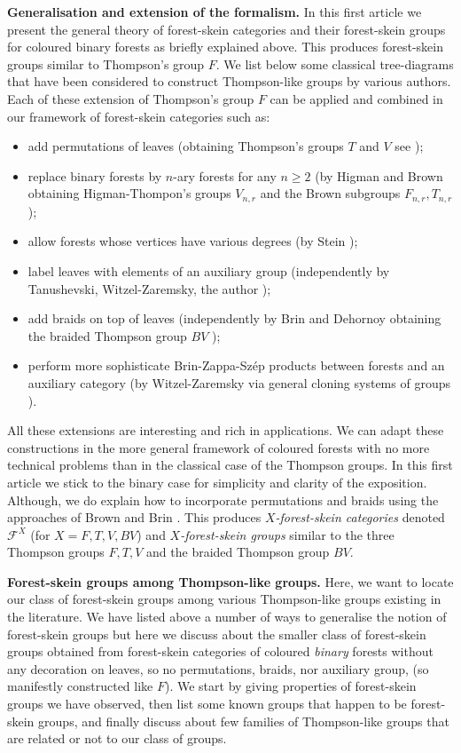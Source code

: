 \documentclass[a4paper, 12pt]{amsart}
\numberwithin{equation}{section}
\theoremstyle{definition}
\newcommand{\cF}{\mathcal F}
\begin{document}
{\bf Generalisation and extension of the formalism.}
In this first article we present the general theory of forest-skein categories and their forest-skein groups for coloured binary forests as briefly explained above. 
This produces forest-skein groups similar to Thompson's group $F$.
We list below some classical tree-diagrams that have been considered to construct Thompson-like groups by various authors. 
Each of these extension of Thompson's group $F$ can be applied and combined in our framework of forest-skein categories such as: 
\begin{itemize}
\item add permutations of leaves (obtaining Thompson's groups $T$ and $V$ see \cite{Brown87});
\item replace binary forests by $n$-ary forests for any $n\geq 2$ (by Higman and Brown obtaining Higman-Thompon's groups $V_{n,r}$ and the Brown subgroups $F_{n,r}, T_{n,r}$ \cite{Higman74,Brown87});
\item allow forests whose vertices have various degrees (by Stein \cite{Stein92});
\item label leaves with elements of an auxiliary group (independently by Tanushevski, Witzel-Zaremsky, the author \cite{Tanushevski16,Witzel-Zaremsky18, Brothier22, Brothier21});
\item add braids on top of leaves (independently by Brin and Dehornoy obtaining the braided Thompson group $BV$ \cite{Brin-BV1,Brin-BV2,Dehornoy06});
\item perform more sophisticate Brin-Zappa-Sz\'ep products between forests and an auxiliary category (by Witzel-Zaremsky via general cloning systems of groups \cite{Witzel-Zaremsky18}).
\end{itemize}
All these extensions are interesting and rich in applications. 
We can adapt these constructions in the more general framework of coloured forests with no more technical problems than in the classical case of the Thompson groups. 
In this first article we stick to the binary case for simplicity and clarity of the exposition. 
Although, we do explain how to incorporate permutations and braids using the approaches of Brown and Brin \cite{Brown87,Brin-BV1}.
This produces {\it $X$-forest-skein categories} denoted $\cF^X$ (for $X=F,T,V,BV$) and {\it $X$-forest-skein groups} similar to the three Thompson groups $F,T,V$ and the braided Thompson group $BV$.

{\bf Forest-skein groups among Thompson-like groups.}
Here, we want to locate our class of forest-skein groups among various Thompson-like groups existing in the literature. 
We have listed above a number of ways to generalise the notion of forest-skein groups but here we discuss about the smaller class of forest-skein groups obtained from forest-skein categories of coloured {\it binary} forests without any decoration on leaves, so no permutations, braids, nor auxiliary group, (so manifestly constructed like $F$).
We start by giving properties of forest-skein groups we have observed, then list some known groups that happen to be forest-skein groups, and finally discuss about few families of Thompson-like groups that are related or not to our class of groups.
\end{document}
